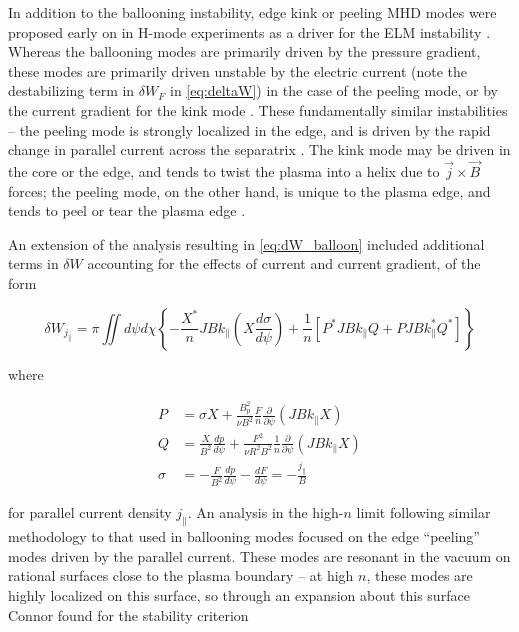 In addition to the ballooning instability, edge kink or peeling MHD modes were proposed early on in H-mode experiments as a driver for the ELM instability \cite{Keilhacker1984,Zohm1996}.  Whereas the ballooning modes are primarily driven by the pressure gradient, these modes are primarily driven unstable by the electric current (note the destabilizing term in $\delta W_F$ in \cref{eq:deltaW}) in the case of the peeling mode, or by the current gradient for the kink mode \cite{Wilson2006}.  These fundamentally similar instabilities -- the peeling mode is strongly localized in the edge, and is driven by the rapid change in parallel current across the separatrix \cite{Wilson2006,Connor1998a}.  The kink mode may be driven in the core or the edge, and tends to twist the plasma into a helix due to $\vec{j} \times \vec{B}$ forces; the peeling mode, on the other hand, is unique to the plasma edge, and tends to peel or tear the plasma edge \cite{Wilson1999}.

An extension of the analysis resulting in \cref{eq:dW_balloon} \cite{Connor1979} included additional terms in $\delta W$ accounting for the effects of current and current gradient, of the form

\begin{equation}\label{eq:dW_balloon_current}
  \delta W_{j_\parallel} = \pi \iint d\psi d\chi \left\{ - \frac{X^*}{n} JB k_\parallel \left( X \frac{d \sigma}{d \psi} \right) + \frac{1}{n} \left[ P^* JB k_\parallel Q + PJBk_\parallel^* Q^* \right] \right\}
\end{equation}

\noindent where

\begin{equation}\label{eq:dW_current_defs}
 \begin{aligned}
  P &= \sigma X + \frac{B_p^2}{\nu B^2} \frac{F}{n} \frac{\partial}{\partial \psi} \left( JBk_\parallel X \right)\\
  Q &= \frac{X}{B^2} \frac{dp}{d\psi} + \frac{F^2}{\nu R^2 B^2} \frac{1}{n} \frac{\partial}{\partial \psi} \left( JBk_\parallel X \right)\\
  \sigma &= -\frac{F}{B^2} \frac{dp}{d\psi} - \frac{dF}{d\psi} = -\frac{j_\parallel}{B}
 \end{aligned}
\end{equation}

\noindent for parallel current density $j_\parallel$.  An analysis in the high-$n$ limit following similar methodology to that used in ballooning modes \cite{Connor1998a} focused on the edge ``peeling'' modes driven by the parallel current.  These modes are resonant in the vacuum on rational surfaces close to the plasma boundary -- at high $n$, these modes are highly localized on this surface, so through an expansion about this surface Connor \etal \cite{Connor1998a} found for the stability criterion

